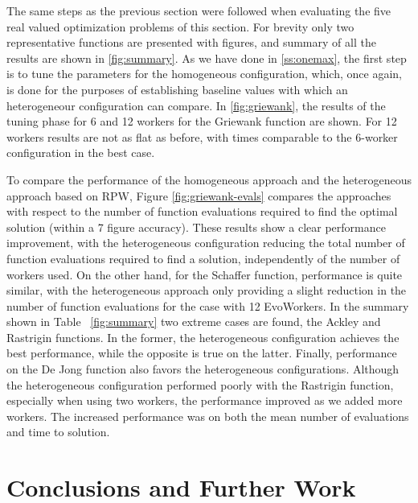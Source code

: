 \documentclass[conference]{IEEEtran}
\begin{document}
The same steps as the previous section were followed when evaluating the five real valued
optimization problems of this section.  For brevity only two representative functions are
presented with figures, and summary of all the results are shown in
\autoref{fig:summary}. As we have done in \autoref{ss:onemax},
the first step is to tune the parameters for the homogeneous
configuration, which, once again, is done for the purposes of
establishing baseline values with which an heterogeneour configuration
can compare.
In \autoref{fig:griewank}, the results of the tuning phase for 6 and 12 workers
for the Griewank function are shown. For 12 workers results are not as flat as before,
with times comparable to the 6-worker configuration in the best case.

To compare the performance of the homogeneous approach and the heterogeneous approach based on RPW,
Figure \ref{fig:griewank-evals} compares the approaches with respect to the number of function evaluations required to find the optimal solution (within a 7 figure accuracy).
These results show a clear performance improvement, with the heterogeneous configuration
reducing the total number of function evaluations required to find a solution,
independently of the number of workers used.
On the other hand, for the Schaffer function, performance is quite similar,
with the heterogeneous approach only providing a slight reduction in the number
of function evaluations for the case with 12 EvoWorkers.
In the summary shown in Table ~\ref{fig:summary} two extreme cases are found, the Ackley and Rastrigin functions.
In the former, the heterogeneous configuration achieves the best performance, while the opposite is true on the latter.
Finally, performance on the De Jong function also favors the heterogeneous configurations.
Although the heterogeneous configuration performed poorly with the Rastrigin
function, especially when using two workers, the performance improved as we
added more workers.  The increased performance was on both the mean number of
evaluations and time to solution.


\section{Conclusions and Further Work}
\label{sec:conclusions}
\end{document}
